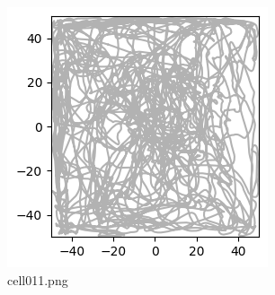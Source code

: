 \begin{figure}[ht]
	\centering
	\includegraphics[scale=0.8, max width=\linewidth]{./fig/appendix/grid-cells-decoding/cell011.png}
	\caption{cell011.png}
	\label{cell011.png}
\end{figure}